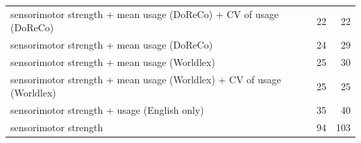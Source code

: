 \begin{table}[ht]
\begin{tabular}{lrr}
  sensorimotor strength + mean usage (DoReCo) + CV of usage (DoReCo) & 22 & 22 \\ 
  sensorimotor strength + mean usage (DoReCo) & 24 & 29 \\ 
  sensorimotor strength + mean usage (Worldlex) & 25 & 30 \\ 
  sensorimotor strength + mean usage (Worldlex) + CV of usage (Worldlex) & 25 & 25 \\ 
  sensorimotor strength + usage (English only) & 35 & 40 \\ 
  sensorimotor strength & 94 & 103 \\ 
   \hline
\end{tabular}
\end{table}
